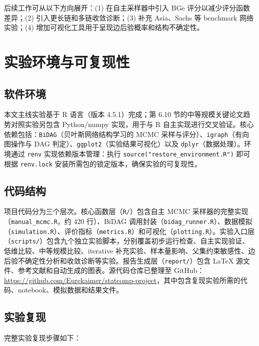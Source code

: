 \documentclass[UTF8,a4paper,12pt]{ctexart}
\begin{document}
后续工作可从以下方向展开：(1) 在自主采样器中引入 BGe 评分以减少评分函数差异；(2) 引入更长链和多链收敛诊断；(3) 补充 Asia、Sachs 等 benchmark 网络实验；(4) 增加可视化工具用于呈现边后验概率和结构不确定性。

\clearpage



\FloatBarrier
\newpage
\appendix

\section{实验环境与可复现性}

\subsection{软件环境}

本文主线实验基于 R 语言（版本 4.5.1）完成；第 6.10 节的中等规模关键论文趋势对照实验另包含 Python/numpy 实现，用于与 R 自主实现进行交叉验证。核心依赖包括：\texttt{BiDAG}（贝叶斯网络结构学习的 MCMC 采样与评分）\citep{suter2023bidag}、\texttt{igraph}（有向图操作与 DAG 判定）、\texttt{ggplot2}（实验结果可视化）以及 \texttt{dplyr}（数据处理）。环境通过 \texttt{renv} 实现依赖版本管理：执行 \texttt{source("restore\_environment.R")} 即可根据 \texttt{renv.lock} 安装所需包的锁定版本，确保实验的可复现性。

\subsection{代码结构}

项目代码分为三个层次。核心函数层（\texttt{R/}）包含自主 MCMC 采样器的完整实现（\texttt{manual\_mcmc.R}，约 420 行）、BiDAG 调用封装（\texttt{bidag\_runner.R}）、数据模拟（\texttt{simulation.R}）、评价指标（\texttt{metrics.R}）和可视化（\texttt{plotting.R}）。实验入口层（\texttt{scripts/}）包含九个独立实验脚本，分别覆盖初步运行检查、自主实现验证、低维比较、中等规模比较、iterative 补充实验、样本量影响、父集约束敏感性、边后验不确定性分析和收敛诊断等实验。报告生成层（\texttt{report/}）包含 LaTeX 源文件、参考文献和自动生成的图表。源代码仓库已整理至 GitHub：\url{https://github.com/Eurekaimer/statcomp-project}，其中包含复现实验所需的代码、notebook、模拟数据和结果文件。

\subsection{实验复现}

完整实验复现步骤如下：
\end{document}
